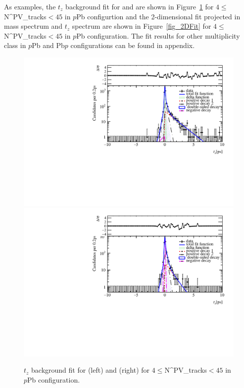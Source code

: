 As examples, the $t_z$ background fit for \jpsi and \psitwos are shown in Figure~\ref{fig_tzbkg} for $4\leq $N^{\rm PV}_{\rm tracks}$ < 45$ in $p$Pb  configurtion and the 2-dimensional fit projected in mass spectrum and $t_z$ spectrum are shown in Figure~\ref{fig_2DFit} for $4\leq $N^{\rm PV}_{\rm tracks}$ < 45$ in  $p$Pb configuration. The fit results for other multiplicity class in $p$Pb and Pb$p$ configurations can be found in appendix.
\begin{figure}[!tbp]
\begin{center}
\includegraphics[width=0.49\linewidth]{pdf/pPb/Workdir/TzbkgFit/Jpsi_n1y1pt1.pdf}
\includegraphics[width=0.49\linewidth]{pdf/pPb/Workdir/TzbkgFit/Psi2S_n1y1pt1.pdf}
\end{center}
\caption{
	$t_z$ background fit for \jpsi (left) and \psitwos (right) for $4\leq $N^{\rm PV}_{\rm tracks}$ < 45$ in $p$Pb configuration.}
\label{fig_tzbkg}
\end{figure}
